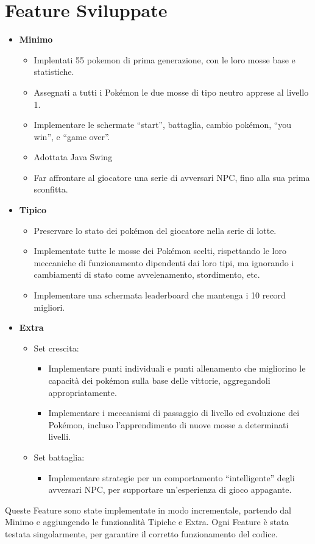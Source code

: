 \documentclass[12pt]{article}
\begin{document}
\section{Feature Sviluppate}
\begin{itemize}
    \item \textbf{Minimo}
          \begin{itemize}
              \item Implentati 55 pokemon di prima generazione, con le loro mosse base e statistiche.
              \item Assegnati a tutti i Pokémon le due mosse di tipo neutro apprese al livello 1.
              \item Implementare le schermate “start”, battaglia, cambio pokémon, “you win”, e “game over”.
              \item Adottata Java Swing
              \item Far affrontare al giocatore una serie di avversari NPC, fino alla sua prima sconfitta.
          \end{itemize}
    \item \textbf{Tipico}
          \begin{itemize}
              \item Preservare lo stato dei pokémon del giocatore nella serie di lotte.
              \item Implementate tutte le mosse dei Pokémon scelti, rispettando le loro meccaniche di funzionamento dipendenti dai loro tipi, ma ignorando i cambiamenti di stato come avvelenamento, stordimento, etc.
              \item Implementare una schermata leaderboard che mantenga i 10 record migliori.
          \end{itemize}
    \item \textbf{Extra}
          \begin{itemize}
              \item Set crescita:
                    \begin{itemize}
                        \item Implementare punti individuali e punti allenamento che migliorino le capacità dei pokémon sulla base delle vittorie, aggregandoli appropriatamente.
                        \item Implementare i meccanismi di passaggio di livello ed evoluzione dei Pokémon, incluso l’apprendimento di nuove mosse a determinati livelli.
                    \end{itemize}
              \item Set battaglia:
                    \begin{itemize}
                        \item Implementare strategie per un comportamento “intelligente” degli avversari NPC, per supportare un’esperienza di gioco appagante.
                    \end{itemize}
          \end{itemize}
\end{itemize}
Queste Feature sono state implementate in modo incrementale, partendo dal Minimo e aggiungendo le funzionalità Tipiche e Extra. Ogni Feature è stata testata singolarmente, per garantire il corretto funzionamento del codice.
\end{document}
